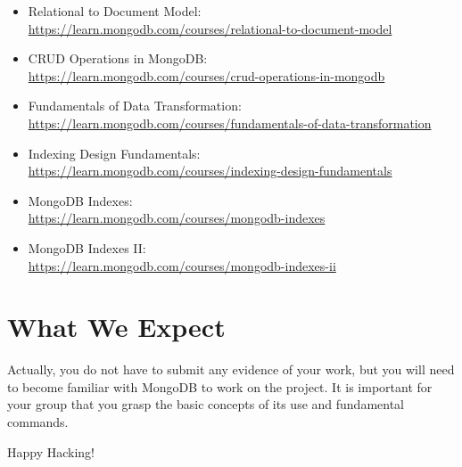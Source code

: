 \documentclass{article}
\begin{document}
\begin{itemize}
    \item Relational to Document Model:\\ \url{https://learn.mongodb.com/courses/relational-to-document-model}
    \item CRUD Operations in MongoDB:\\ \url{https://learn.mongodb.com/courses/crud-operations-in-mongodb}
    \item Fundamentals of Data Transformation:\\ \url{https://learn.mongodb.com/courses/fundamentals-of-data-transformation}
    \item Indexing Design Fundamentals:\\ \url{https://learn.mongodb.com/courses/indexing-design-fundamentals}
    \item MongoDB Indexes:\\ \url{https://learn.mongodb.com/courses/mongodb-indexes}
    \item MongoDB Indexes II:\\ \url{https://learn.mongodb.com/courses/mongodb-indexes-ii}
\end{itemize}




\section{What We Expect}
Actually, you do not have to submit any evidence of your work, but you will need to become familiar with MongoDB to work on the project. It is important for your group that you grasp the basic concepts of its use and fundamental commands.

\vspace{5mm}
Happy Hacking! 
\end{document}
